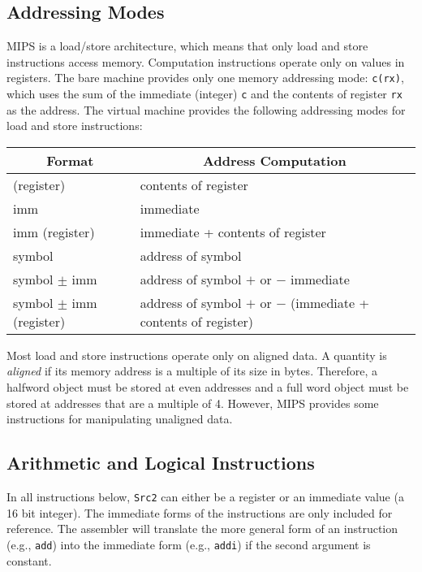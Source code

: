 \documentclass[11pt]{article}
\begin{document}
\subsection {Addressing Modes}

MIPS is a load/store architecture, which means that only load and
store instructions access memory.  Computation instructions operate
only on values in registers.  The bare machine provides only one
memory addressing mode: {\tt c(rx)}, which uses the sum of the
immediate (integer) {\tt c} and the contents of register {\tt rx} as
the address.  The virtual machine provides the following addressing
modes for load and store instructions:
\begin{center}
  \small
  \begin{tabular}{|l|l|}
    \hline
    \multicolumn{1}{|c|}{\bf Format} &
	\multicolumn{1}{|c|}{\bf Address Computation} \\
    \hline
    \hline
    (register) &  contents of register \\
    imm & immediate \\
    imm (register) & immediate + contents of register \\
    symbol & address of symbol \\
    symbol $\pm$ imm & address of symbol $+$ or $-$ immediate \\
    symbol $\pm$ imm (register) & address of symbol $+$ or $-$
	(immediate + contents of register) \\
    \hline
  \end{tabular}
\end{center}

Most load and store instructions operate only on aligned data.  A
quantity is {\em aligned\/} if its memory address is a multiple of its
size in bytes.  Therefore, a halfword object must be stored at even
addresses and a full word object must be stored at addresses that are
a multiple of 4.  However, MIPS provides some instructions for
manipulating unaligned data.

\subsection {Arithmetic and Logical Instructions}

In all instructions below, {\tt Src2} can either be a register or an
immediate value (a 16 bit integer). The immediate forms of the
instructions are only included for reference.  The assembler will
translate the more general form of an instruction (e.g., {\tt add})
into the immediate form (e.g., {\tt addi}) if the second argument is
constant.
\end{document}
